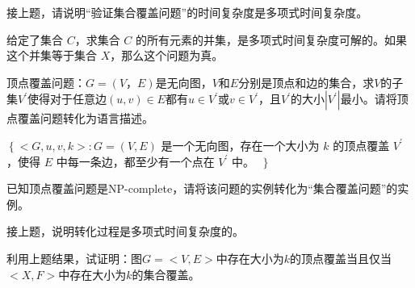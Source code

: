 \begin{problem}
	接上题，请说明“验证集合覆盖问题”的时间复杂度是多项式时间复杂度。
\end{problem}
\begin{solution}
	给定了集合 $C$，求集合 $C$ 的所有元素的并集，是多项式时间复杂度可解的。如果这个并集等于集合 $X$，那么这个问题为真。
\end{solution}


\begin{problem}
	顶点覆盖问题：$G=(V，E)$是无向图，$V$和$E$分别是顶点和边的集合，求$V$的子集$V^\prime$使得对于任意边$(u,v)\in E$都有$u\in V^\prime$或$v\in V^\prime$，且$V^\prime$的大小$|V^\prime|$最小。请将顶点覆盖问题转化为语言描述。
\end{problem}
\begin{solution}
	$\left\{<G, u, v, k>\right. : G = (V, E)$ 是一个无向图，存在一个大小为 $k$ 的顶点覆盖 $V^\prime$，使得 $E$ 中每一条边，都至少有一个点在 $V^\prime$ 中。 $\
	\left.\right\}$
\end{solution}


\begin{problem}
	已知顶点覆盖问题是NP-complete，请将该问题的实例转化为“集合覆盖问题”的实例。
\end{problem}
\begin{solution}

\end{solution}


\begin{problem}
	接上题，说明转化过程是多项式时间复杂度的。
\end{problem}
\begin{solution}

\end{solution}


\begin{problem}
	利用上题结果，试证明：图$G=<V,E>$中存在大小为$k$的顶点覆盖当且仅当$<X,F>$中存在大小为$k$的集合覆盖。
\end{problem}
\begin{solution}

\end{solution}



